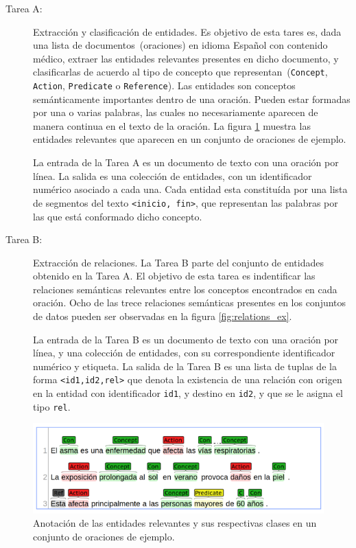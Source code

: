 \begin{description}
	\item[Tarea A:] Extracción y clasificación de entidades.
	Es objetivo de esta tares es, dada una lista de documentos~(oraciones) en idioma Español con contenido médico, extraer las entidades relevantes presentes en dicho documento, y clasificarlas de acuerdo al tipo de concepto que representan~(\texttt{Concept}, \texttt{Action}, \texttt{Predicate} o \texttt{Reference}).
	Las entidades son conceptos semánticamente importantes dentro de una oración.
	Pueden estar formadas por una o varias palabras, las cuales no necesariamente aparecen de manera continua en el texto de la oración.
	La figura \ref{fig:entites_ex} muestra las entidades relevantes que aparecen en un conjunto de oraciones de ejemplo.
	
	La entrada de la Tarea A es un documento de texto con una oración	por línea.
	La salida es una colección de entidades, con un identificador numérico asociado a cada una.
	Cada entidad esta constituída por una lista de segmentos del texto \texttt{<inicio, fin>}, que representan las palabras por las que está conformado dicho concepto.
	
	\item[Tarea B:] Extracción de relaciones.
	La Tarea B parte del conjunto de entidades obtenido en la Tarea A.
	El objetivo de esta tarea es indentificar las relaciones semánticas relevantes entre los conceptos encontrados en cada oración.
	Ocho de las trece relaciones semánticas presentes en los conjuntos de datos pueden ser observadas en la figura \ref{fig:relations_ex}.
		
	La entrada de la Tarea B es un documento de texto con una oración	por línea, y una colección de entidades, con su correspondiente identificador numérico y etiqueta.
	La salida de la Tarea B es una lista de tuplas de la forma \texttt{<id1,id2,rel>} que denota la existencia de una relación con origen en la entidad con identificador \texttt{id1}, y destino en \texttt{id2}, y que se le asigna el tipo \texttt{rel}.
	
\end{description} 
	
\begin{figure}[h!]
	\centering
	\includegraphics[width=0.9\linewidth]{Graphics/entities.png}
	\caption{Anotación de las entidades relevantes y sus respectivas clases en un conjunto de oraciones de ejemplo.} \label{fig:entites_ex}
\end{figure}

